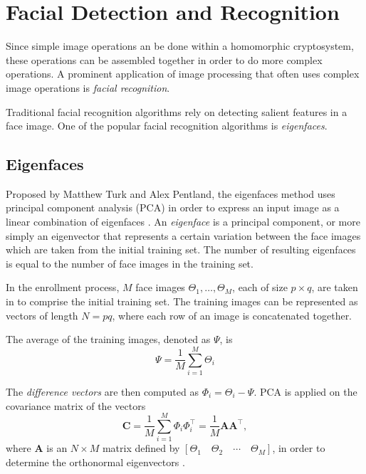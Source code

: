 \section{Facial Detection and Recognition}

Since simple image operations an be done within a homomorphic cryptosystem, these operations can be assembled together in order to do more complex operations. A prominent application of image processing that often uses complex image operations is \textit{facial recognition}.

Traditional facial recognition algorithms rely on detecting salient features in a face image. One of the popular facial recognition algorithms is \textit{eigenfaces}.

\subsection{Eigenfaces}

Proposed by Matthew Turk and Alex Pentland, the eigenfaces method uses principal component analysis (PCA) in order to express an input image as a linear combination of eigenfaces \cite{turk_eigenfaces_1991}. An \textit{eigenface} is a principal component, or more simply an eigenvector that represents a certain variation between the face images which are taken from the initial training set. The number of resulting eigenfaces is equal to the number of face images in the training set.

In the enrollment process, $M$ face images $\Theta_1, \ldots, \Theta_M$, each of size $p \times q$, are taken in to comprise the initial training set. The training images can be represented as vectors of length $N = pq$, where each row of an image is concatenated together.

The average of the training images, denoted as $\Psi$, is 
\[ \Psi = \frac{1}{M} \sum_{i=1}^{M} \Theta_i \]

The \textit{difference vectors} are then computed as $\Phi_i = \Theta_i - \Psi$. PCA is applied on the covariance matrix of the vectors
\[ \mathbf{C} = \frac{1}{M} \sum_{i=1}^M \Phi_i \Phi_i^\top = \frac{1}{M} \mathbf{A}\mathbf{A}^\top,\]
where $\mathbf{A}$ is an $N \times M$ matrix defined by $\left[\Theta_1 \quad \Theta_2 \quad \cdots \quad \Theta_M\right]$, in order to determine the orthonormal eigenvectors \cite{hutchison_privacy-preserving_2009}.

